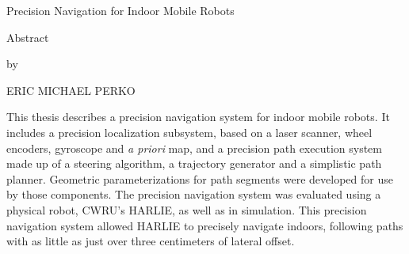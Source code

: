 \begin{center}
    Precision Navigation for Indoor Mobile Robots

    \vspace{0.1\textheight}

    Abstract

    by

    ERIC MICHAEL PERKO
\end{center}

This thesis describes a precision navigation system for indoor mobile robots. It includes a precision localization subsystem, based on a laser scanner, wheel encoders, gyroscope and \emph{a priori} map, and a precision path execution system made up of a steering algorithm, a trajectory generator and a simplistic path planner. Geometric parameterizations for path segments were developed for use by those components. The precision navigation system was evaluated using a physical robot, CWRU's HARLIE, as well as in simulation. This precision navigation system allowed HARLIE to precisely navigate indoors, following paths with as little as just over three centimeters of lateral offset.